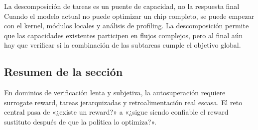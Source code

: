 \begin{knowledgebox}{La descomposición de tareas es un puente de capacidad, no la respuesta final}
Cuando el modelo actual no puede optimizar un chip completo, se puede empezar con el kernel, módulos locales y análisis de profiling. La descomposición permite que las capacidades existentes participen en flujos complejos, pero al final aún hay que verificar si la combinación de las subtareas cumple el objetivo global.
\end{knowledgebox}

\subsection{Resumen de la sección}

En dominios de verificación lenta y subjetiva, la autosuperación requiere surrogate reward, tareas jerarquizadas y retroalimentación real escasa. El reto central pasa de «¿existe un reward?» a «¿sigue siendo confiable el reward sustituto después de que la política lo optimiza?».
